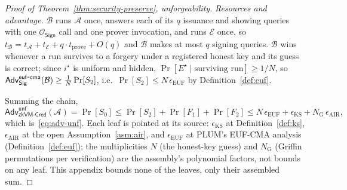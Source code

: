 \begin{proof}[Proof of Theorem~\ref{thm:security-preserve}, unforgeability]
\emph{Resources and advantage.} $\mathcal B$ runs $\mathcal A$ once, answers each of its $q$ issuance and showing queries with one $\mathcal O_{\mathsf{Sign}}$ call and one prover invocation, and runs $\mathcal E$ once, so $t_{\mathcal B}=t_{\mathcal A}+t_{\mathcal E}+q\cdot t_{\mathrm{prove}}+O(q)$ and $\mathcal B$ makes at most $q$ signing queries. $\mathcal B$ wins whenever a run survives to a forgery under a registered honest key and its guess is correct; since $i^\star$ is uniform and hidden, $\Pr[E^\star\mid\text{surviving run}]\ge 1/N$, so $\mathsf{Adv}^{\mathsf{euf\mbox{-}cma}}_{\mathsf{Sig}}(\mathcal B)\ge \tfrac1N\Pr[S_2]$, i.e.\ $\Pr[S_2]\le N\,\epsilon_{\mathrm{EUF}}$ by Definition~\ref{def:euf}.

    \smallskip\noindent Summing the chain,
    \[
      \mathsf{Adv}^{\mathsf{unf}}_{\mathsf{zkVM\text{-}Cred}}(\mathcal A)=\Pr[S_0]
      \le \Pr[S_2]+\Pr[F_1]+\Pr[F_2]
      \le N\,\epsilon_{\mathrm{EUF}}+\epsilon_{\mathrm{KS}}
         +N_{\mathrm G}\,\epsilon_{\mathrm{AIR}},
    \]
which is~\eqref{eq:adv-unf}. Each leaf is pointed at its source: $\epsilon_{\mathrm{KS}}$ at Definition~\ref{def:ks}, $\epsilon_{\mathrm{AIR}}$ at the open Assumption~\ref{asm:air}, and $\epsilon_{\mathrm{EUF}}$ at PLUM's EUF-CMA analysis (Definition~\ref{def:euf}); the multiplicities $N$ (the honest-key guess) and $N_{\mathrm G}$ (Griffin permutations per verification) are the assembly's polynomial factors, not bounds on any leaf. This appendix bounds none of the leaves, only their assembled sum.
\end{proof}


